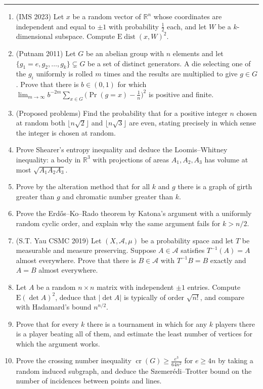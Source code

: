 \documentclass[11pt,a4paper]{article}
\renewcommand{\ge}{\geqslant}
\begin{document}
\noindent\rule{\textwidth}{0.4pt}\par\vspace{4pt}
\begin{enumerate}
\item (IMS 2023) Let $x$ be a random vector of $\mathbb R^n$ whose coordinates are independent and
equal to $\pm1$ with probability $\frac12$ each, and let $W$ be a $k$-dimensional subspace. Compute
$\mathrm E\operatorname{dist}(x,W)^2$.

\item (Putnam 2011) Let $G$ be an abelian group with $n$ elements and let
$\{g_1=e,g_2,\dots,g_k\}\subsetneq G$ be a set of distinct generators. A die selecting one of the
$g_i$ uniformly is rolled $m$ times and the results are multiplied to give $g\in G$. Prove that there
is $b\in(0,1)$ for which $\lim_{m\to\infty}b^{-2m}\sum_{x\in G}\bigl(\Pr(g=x)-\frac1n\bigr)^2$ is
positive and finite.

\item (Proposed problems) Find the probability that for a positive integer $n$ chosen at random both
$\lfloor n\sqrt2\rfloor$ and $\lfloor n\sqrt3\rfloor$ are even, stating precisely in which sense the
integer is chosen at random.

\item Prove Shearer's entropy inequality and deduce the Loomis--Whitney inequality: a body in
$\mathbb R^3$ with projections of areas $A_1,A_2,A_3$ has volume at most $\sqrt{A_1A_2A_3}$.

\item Prove by the alteration method that for all $k$ and $g$ there is a graph of girth greater than
$g$ and chromatic number greater than $k$.

\item Prove the Erd\H{o}s--Ko--Rado theorem by Katona's argument with a uniformly random cyclic
order, and explain why the same argument fails for $k>n/2$.

\item (S.T. Yau CSMC 2019) Let $(X,\mathcal A,\mu)$ be a probability space and let $T$ be measurable
and measure preserving. Suppose $A\in\mathcal A$ satisfies $T^{-1}(A)=A$ almost everywhere. Prove that
there is $B\in\mathcal A$ with $T^{-1}B=B$ exactly and $A=B$ almost everywhere.

\item Let $A$ be a random $n\times n$ matrix with independent $\pm1$ entries. Compute
$\mathrm E(\det A)^2$, deduce that $|\det A|$ is typically of order $\sqrt{n!}$, and compare with
Hadamard's bound $n^{n/2}$.

\item Prove that for every $k$ there is a tournament in which for any $k$ players there is a player
beating all of them, and estimate the least number of vertices for which the argument works.

\item Prove the crossing number inequality $\operatorname{cr}(G)\ge\frac{e^3}{64n^2}$ for $e\ge4n$ by
taking a random induced subgraph, and deduce the Szemer\'edi--Trotter bound on the number of
incidences between points and lines.
\end{enumerate}
\end{document}
